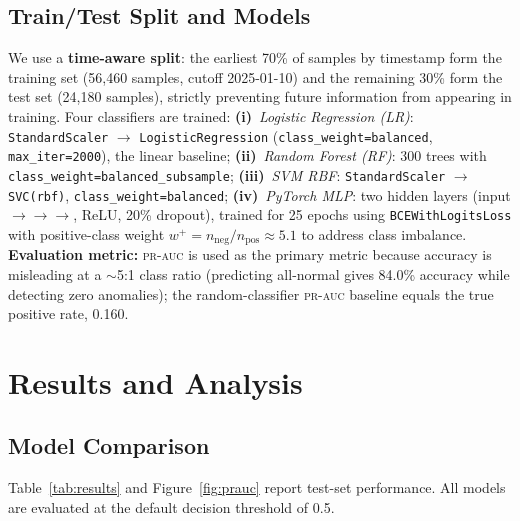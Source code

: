 \documentclass{article}
\newcommand{\prauc}{\textsc{pr-auc}\xspace}
\begin{document}
\subsection{Train/Test Split and Models}

We use a \textbf{time-aware split}: the earliest 70\% of samples by timestamp
form the training set (56{,}460 samples, cutoff 2025-01-10) and the remaining
30\% form the test set (24{,}180 samples), strictly preventing future information
from appearing in training.
Four classifiers are trained:
\textbf{(i)}~\textit{Logistic Regression (LR)}: \texttt{StandardScaler} $\to$
\texttt{LogisticRegression} (\texttt{class\_weight=balanced},
\texttt{max\_iter=2000}), the linear baseline;
\textbf{(ii)}~\textit{Random Forest (RF)}: 300 trees with
\texttt{class\_weight=balanced\_subsample};
\textbf{(iii)}~\textit{SVM RBF}: \texttt{StandardScaler} $\to$ \texttt{SVC(rbf)},
\texttt{class\_weight=balanced};
\textbf{(iv)}~\textit{PyTorch MLP}: two hidden layers
(input\;$\to$\;$\to$\;$\to$, ReLU, 20\% dropout), trained for 25
epochs using \texttt{BCEWithLogitsLoss} with positive-class weight
$w^+\!=\!n_\mathrm{neg}/n_\mathrm{pos}\!\approx\!5.1$ to address class
imbalance.
\textbf{Evaluation metric:} \prauc is used as the primary metric because
accuracy is misleading at a $\sim$5:1 class ratio (predicting all-normal gives 84.0\%
accuracy while detecting zero anomalies); the random-classifier \prauc baseline
equals the true positive rate, 0.160.

\section{Results and Analysis}
\label{sec:results}

\subsection{Model Comparison}

Table~\ref{tab:results} and Figure~\ref{fig:prauc} report test-set performance.
All models are evaluated at the default decision threshold of 0.5.
\end{document}
